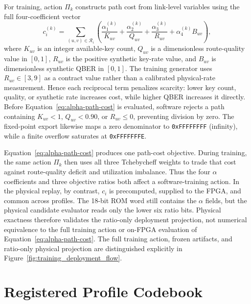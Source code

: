 For training, action $\Pi_k$ constructs path cost from link-level variables using
the full four-coefficient vector
\begin{equation}
c_i^{(k)}=\sum_{(u,v)\in\mathcal R_i}
\left(\frac{\alpha_1^{(k)}}{K_{uv}}+
\frac{\alpha_2^{(k)}}{Q_{uv}}+
\frac{\alpha_3^{(k)}}{R_{uv}}+
\alpha_4^{(k)}B_{uv}\right),
\label{eq:alpha-path-cost}
\end{equation}
where $K_{uv}$ is an integer available-key count, $Q_{uv}$ is a dimensionless
route-quality value in $[0,1]$, $R_{uv}$ is the positive synthetic key-rate value,
and $B_{uv}$ is dimensionless synthetic QBER in $[0,1]$. The training generator
uses $R_{uv}\in[3,9]$ as a contract value rather than a calibrated physical-rate
measurement. Hence each reciprocal term penalizes scarcity: lower key count,
quality, or synthetic rate increases cost, while higher QBER increases it directly.
Before Equation~\eqref{eq:alpha-path-cost} is evaluated, software rejects a path
containing $K_{uv}<1$, $Q_{uv}<0.90$, or $R_{uv}\leq0$, preventing division by
zero. The fixed-point export likewise maps a zero denominator to
\texttt{0xFFFFFFFF} (infinity), while a finite overflow saturates at
\texttt{0xFFFFFFFE}.

Equation~\eqref{eq:alpha-path-cost} produces one path-cost objective. During
training, the same action $\Pi_k$ then uses all three Tchebycheff weights to trade
that cost against route-quality deficit and utilization imbalance. Thus the four
$\alpha$ coefficients and three objective ratios both affect a software-training
action. In the physical replay,
by contrast, $c_i$ is precomputed, supplied to the FPGA, and common across profiles.
The 18-bit ROM word still contains the $\alpha$ fields, but the physical candidate
evaluator reads only the lower six ratio bits. Physical exactness therefore validates
the ratio-only deployment projection, not numerical equivalence to the full
training action or on-FPGA evaluation of Equation~\eqref{eq:alpha-path-cost}.
The full training action, frozen artifacts, and ratio-only physical projection are
distinguished explicitly in Figure~\ref{fig:training_deployment_flow}.

\section{Registered Profile Codebook}

